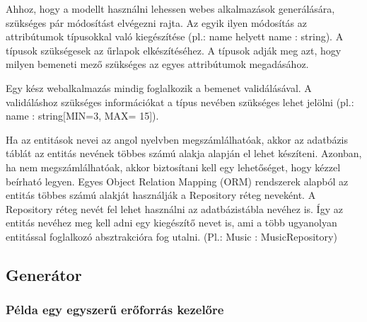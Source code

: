 \documentclass[a4paper,12pt,oneside]{report}
\begin{document}
\begin{justify}

	Ahhoz, hogy a modellt használni lehessen webes alkalmazások generálására, szükséges pár módosítást elvégezni rajta. Az egyik ilyen módosítás az attribútumok típusokkal való kiegészítése (pl.: name helyett name : string). A típusok szükségesek az űrlapok elkészítéséhez. A típusok adják meg azt, hogy milyen bemeneti mező szükséges az egyes attribútumok megadásához.

	Egy kész webalkalmazás mindig foglalkozik a bemenet validálásával. A validáláshoz szükséges információkat a típus nevében szükséges lehet jelölni (pl.: name : string[MIN=3, MAX= 15]).

	Ha az entitások nevei az angol nyelvben megszámlálhatóak, akkor az adatbázis táblát az entitás nevének többes számú alakja alapján el lehet készíteni. Azonban, ha nem megszámlálhatóak, akkor biztosítani kell egy lehetőséget, hogy kézzel beírható legyen. Egyes Object Relation Mapping (ORM) rendszerek alapból az entitás többes számú alakját használják a Repository réteg neveként. A Repository réteg nevét fel lehet használni az adatbázistábla nevéhez is. Így az entitás nevéhez meg kell adni egy kiegészítő nevet is, ami a több ugyanolyan entitással foglalkozó absztrakcióra fog utalni. (Pl.: Music : MusicRepository)

\end{justify}

\newpage
\subsection{Generátor}
\subsubsection{Példa egy egyszerű erőforrás kezelőre}
\end{document}
